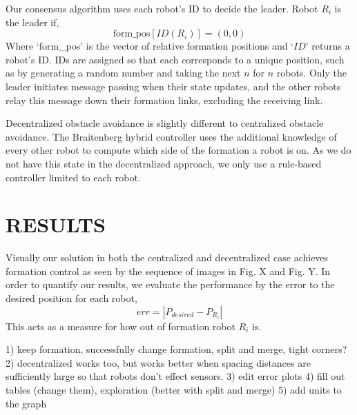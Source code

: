 \documentclass[letterpaper, 10 pt, conference]{ieeeconf}  %
\begin{document}
Our consensus algorithm uses each robot's ID to decide the leader. Robot $R_i$ is the leader if,
\[\text{form\_pos}[ID(R_i)] = (0,0)\]
Where `form\_pos' is the vector of relative formation positions and `$ID$' returns a robot's ID. IDs are assigned so that each corresponds to a unique position, such as by generating a random number and taking the next $n$ for $n$ robots. Only the leader initiates message passing when their state updates, and the other robots relay this message down their formation links, excluding the receiving link.

Decentralized obstacle avoidance is slightly different to centralized obstacle avoidance. The Braitenberg hybrid controller uses the additional knowledge of every other robot to compute which side of the formation a robot is on. As we do not have this state in the decentralized approach, we only use a rule-based controller limited to each robot.

\section{RESULTS}
Visually our solution in both the centralized and decentralized case achieves formation control as seen by the sequence of images in Fig. X and Fig. Y. In order to quantify our results, we evaluate the performance by the error to the desired position for each robot,
\[err = |P_{desired} - P_{R_i}|\]
This acts as a measure for how out of formation robot $R_i$ is.

1) keep formation, successfully change formation, split and merge,
tight corners?
2) decentralized works too, but works better when spacing distances are sufficiently large so that robots don't effect sensors.
3) edit error plots
4) fill out tables (change them),
exploration (better with split and merge)
5) add units to the graph

	
\end{document}

